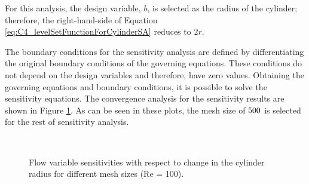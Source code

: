 For this analysis, the design variable, $b$, is selected as the radius of the cylinder; therefore, the right-hand-side of Equation \eqref{eq:C4_levelSetFunctionForCylinderSA} reduces to $2r$.

The boundary conditions for the sensitivity analysis are defined by differentiating the original boundary conditions of the governing equations. These conditions do not depend on the design variables and therefore, have zero values. Obtaining the governing equations and boundary conditions, it is possible to solve the sensitivity equations. The convergence analysis for the sensitivity results are shown in Figure \ref{fig:C4_flowOverCylinderSAmeshConvergence}. As can be seen in these plots, the mesh size of $500 \time 375$ is selected for the rest of sensitivity analysis.

\begin{figure}[H]
    \centering
    \quad
    \\
    \caption{Flow variable sensitivities with respect to change in the cylinder radius for different mesh sizes (Re = 100).}
    \label{fig:C4_flowOverCylinderSAmeshConvergence}
\end{figure}

